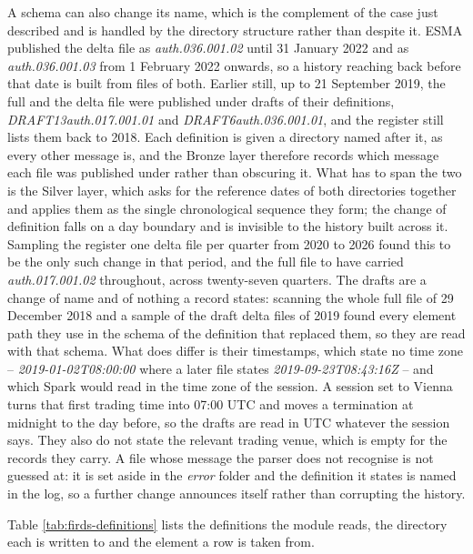 A schema can also change its name, which is the complement of the case just described and is handled by the directory structure rather than despite it. ESMA published the delta file as \emph{auth.036.001.02} until 31 January 2022 and as \emph{auth.036.001.03} from 1 February 2022 onwards, so a history reaching back before that date is built from files of both. Earlier still, up to 21 September 2019, the full and the delta file were published under drafts of their definitions, \emph{DRAFT13auth.017.001.01} and \emph{DRAFT6auth.036.001.01}, and the register still lists them back to 2018. Each definition is given a directory named after it, as every other message is, and the Bronze layer therefore records which message each file was published under rather than obscuring it. What has to span the two is the Silver layer, which asks for the reference dates of both directories together and applies them as the single chronological sequence they form; the change of definition falls on a day boundary and is invisible to the history built across it. Sampling the register one delta file per quarter from 2020 to 2026 found this to be the only such change in that period, and the full file to have carried \emph{auth.017.001.02} throughout, across twenty-seven quarters. The drafts are a change of name and of nothing a record states: scanning the whole full file of 29 December 2018 and a sample of the draft delta files of 2019 found every element path they use in the schema of the definition that replaced them, so they are read with that schema. What does differ is their timestamps, which state no time zone -- \emph{2019-01-02T08:00:00} where a later file states \emph{2019-09-23T08:43:16Z} -- and which Spark would read in the time zone of the session. A session set to Vienna turns that first trading time into 07:00 UTC and moves a termination at midnight to the day before, so the drafts are read in UTC whatever the session says. They also do not state the relevant trading venue, which is empty for the records they carry. A file whose message the parser does not recognise is not guessed at: it is set aside in the \emph{error} folder and the definition it states is named in the log, so a further change announces itself rather than corrupting the history.

Table \ref{tab:firds-definitions} lists the definitions the module reads, the directory each is written to and the element a row is taken from.

